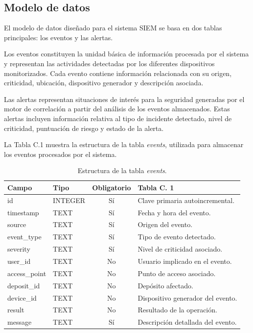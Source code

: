 \subsection{Modelo de datos}

El modelo de datos diseñado para el sistema SIEM se basa en dos tablas principales: los eventos y las alertas.

Los eventos constituyen la unidad básica de información procesada por el sistema y representan las actividades detectadas por los diferentes dispositivos monitorizados. Cada evento contiene información relacionada con su origen, criticidad, ubicación, dispositivo generador y descripción asociada.

Las alertas representan situaciones de interés para la seguridad generadas por el motor de correlación a partir del análisis de los eventos almacenados. Estas alertas incluyen información relativa al tipo de incidente detectado, nivel de criticidad, puntuación de riesgo y estado de la alerta.

La Tabla C.1 muestra la estructura de la tabla \textit{events}, utilizada para almacenar los eventos procesados por el sistema.

\begin{table}[htbp]
	\centering
	\small
	\begin{tabular}{|l|l|c|p{4cm}|}
		\hline
		\textbf{Campo} & \textbf{Tipo} & \textbf{Obligatorio} & \textbf{Tabla C. 1} \\
		\hline
		id & INTEGER & Sí & Clave primaria autoincremental. \\
		timestamp & TEXT & Sí & Fecha y hora del evento. \\
		source & TEXT & Sí & Origen del evento. \\
		event\_type & TEXT & Sí & Tipo de evento detectado. \\
		severity & TEXT & Sí & Nivel de criticidad asociado. \\
		user\_id & TEXT & No & Usuario implicado en el evento. \\
		access\_point & TEXT & No & Punto de acceso asociado. \\
		deposit\_id & TEXT & No & Depósito afectado. \\
		device\_id & TEXT & No & Dispositivo generador del evento. \\
		result & TEXT & No & Resultado de la operación. \\
		message & TEXT & Sí & Descripción detallada del evento. \\
		\hline
	\end{tabular}
	\caption{Estructura de la tabla \textit{events}.}
\end{table}

